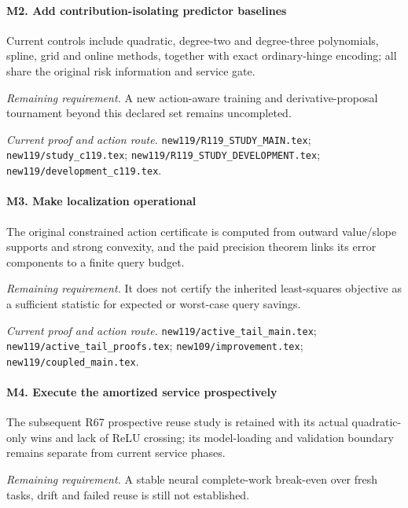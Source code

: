 \paragraph{M2. Add contribution-isolating predictor baselines}

Current controls include quadratic, degree-two and degree-three polynomials, spline, grid and online methods, together with exact ordinary-hinge encoding; all share the original risk information and service gate.

\par\emph{Remaining requirement.} A new action-aware training and derivative-proposal tournament beyond this declared set remains uncompleted.

\par\emph{Current proof and action route.} \nolinkurl{new119/R119_STUDY_MAIN.tex}; \nolinkurl{new119/study_c119.tex}; \nolinkurl{new119/R119_STUDY_DEVELOPMENT.tex}; \nolinkurl{new119/development_c119.tex}.

\paragraph{M3. Make localization operational}

The original constrained action certificate is computed from outward value/\allowbreak{}slope supports and strong convexity, and the paid precision theorem links its error components to a finite query budget.

\par\emph{Remaining requirement.} It does not certify the inherited least-squares objective as a sufficient statistic for expected or worst-case query savings.

\par\emph{Current proof and action route.} \nolinkurl{new119/active_tail_main.tex}; \nolinkurl{new119/active_tail_proofs.tex}; \nolinkurl{new109/improvement.tex}; \nolinkurl{new119/coupled_main.tex}.

\paragraph{M4. Execute the amortized service prospectively}

The subsequent R67 prospective reuse study is retained with its actual quadratic-only wins and lack of ReLU crossing; its model-loading and validation boundary remains separate from current service phases.

\par\emph{Remaining requirement.} A stable neural complete-work break-even over fresh tasks, drift and failed reuse is still not established.

